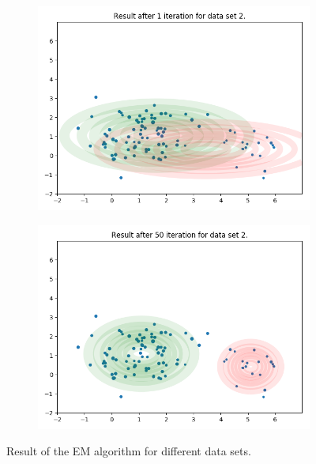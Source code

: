\documentclass[11pt]{extarticle}
\newcommand{\0}{\mathbf{0}}
\renewcommand{\(}{\left(}
\renewcommand{\)}{\right)}
\theoremstyle{definition}
\begin{document}
\begin{figure}[!ht]
\begin{subfigure}{.49\textwidth}
		\includegraphics[width=\linewidth]{2_6_EM2_1}
	\end{subfigure}
	\begin{subfigure}{.49\textwidth}
		\centering
		\includegraphics[width=\linewidth]{2_6_EM2_50}
	\end{subfigure}
	\caption{Result of the EM algorithm for different data sets.}
	\label{fig:2_6_Result}
\end{figure}
\end{document}
